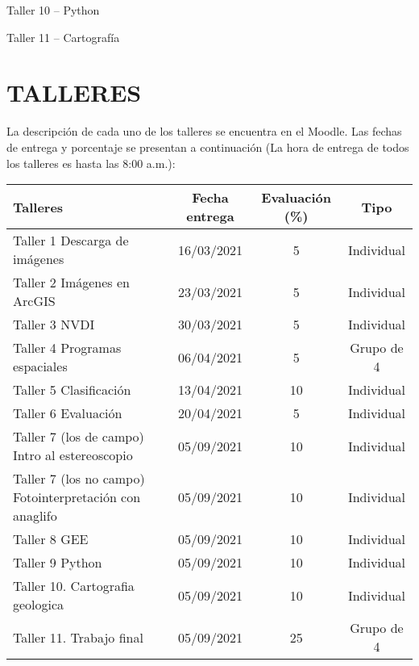 \documentclass[a4paper,twoside,11pt,]{article}
\begin{document}
\begin{tcolorbox}[enhanced,width=5in,center upper,  fontupper=\large\bfseries,drop shadow southwest,sharp corners]
Taller 10 -- Python
\end{tcolorbox}

\begin{tcolorbox}[enhanced,width=5in,center upper,  fontupper=\large\bfseries,drop shadow southwest,sharp corners]
Taller 11 -- Cartografía
\end{tcolorbox}

\section{TALLERES}
La descripción de cada uno de los talleres se encuentra en el Moodle. Las fechas de entrega y porcentaje se presentan a continuación (La hora de entrega de todos los talleres es hasta las 8:00 a.m.):\\
\begin{table}[!hbt]
\label{tab-marks}
\begin{tabular}{|l|c|c|c|}
\hline {\bf Talleres} & {\bf Fecha entrega} & {\bf Evaluación (\%)} & {\bf Tipo} \\
\hline Taller 1 Descarga de imágenes & 16/03/2021 &  5 & Individual\\
\hline Taller 2 Imágenes en ArcGIS &  23/03/2021& 5 & Individual\\
\hline Taller 3 NVDI & 30/03/2021  & 5 & Individual\\
\hline Taller 4 Programas espaciales  & 06/04/2021 &  5 & Grupo de 4\\
\hline Taller 5 Clasificación &  13/04/2021 & 10 & Individual\\
\hline Taller 6 Evaluación & 20/04/2021  & 5 & Individual\\
\hline Taller 7 (los de campo) Intro al estereoscopio & 05/09/2021 &  10 & Individual\\
\hline Taller 7 (los no campo) Fotointerpretación con anaglifo & 05/09/2021 &  10 & Individual\\
\hline Taller 8 GEE &  05/09/2021& 10 & Individual\\
\hline Taller 9 Python  & 05/09/2021  & 10 & Individual\\
\hline Taller 10. Cartografia geologica & 05/09/2021  & 10 & Individual\\
\hline Taller 11. Trabajo final &05/09/2021 & 25 & Grupo de 4\\
\hline
\end{tabular}
\end{table}
\end{document}
